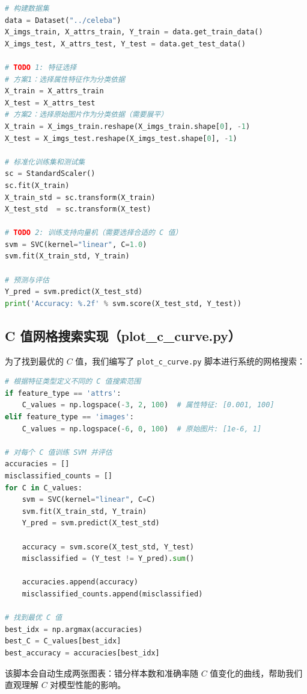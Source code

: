 \documentclass[UTF8]{ctexart}
\begin{document}
\begin{lstlisting}[language=Python, caption=svm.py 核心代码片段]
# 构建数据集
data = Dataset("../celeba")
X_imgs_train, X_attrs_train, Y_train = data.get_train_data()
X_imgs_test, X_attrs_test, Y_test = data.get_test_data()

# TODO 1: 特征选择
# 方案1：选择属性特征作为分类依据
X_train = X_attrs_train
X_test = X_attrs_test
# 方案2：选择原始图片作为分类依据（需要展平）
X_train = X_imgs_train.reshape(X_imgs_train.shape[0], -1)
X_test = X_imgs_test.reshape(X_imgs_test.shape[0], -1)

# 标准化训练集和测试集
sc = StandardScaler()
sc.fit(X_train)
X_train_std = sc.transform(X_train)
X_test_std  = sc.transform(X_test)

# TODO 2: 训练支持向量机（需要选择合适的 C 值）
svm = SVC(kernel="linear", C=1.0)
svm.fit(X_train_std, Y_train)

# 预测与评估
Y_pred = svm.predict(X_test_std)
print('Accuracy: %.2f' % svm.score(X_test_std, Y_test))
\end{lstlisting}

\subsection{C 值网格搜索实现（plot\_c\_curve.py）}
为了找到最优的 $C$ 值，我们编写了 \texttt{plot\_c\_curve.py} 脚本进行系统的网格搜索：

\begin{lstlisting}[language=Python, caption=C 值网格搜索关键代码]
# 根据特征类型定义不同的 C 值搜索范围
if feature_type == 'attrs':
    C_values = np.logspace(-3, 2, 100)  # 属性特征: [0.001, 100]
elif feature_type == 'images':
    C_values = np.logspace(-6, 0, 100)  # 原始图片: [1e-6, 1]

# 对每个 C 值训练 SVM 并评估
accuracies = []
misclassified_counts = []
for C in C_values:
    svm = SVC(kernel="linear", C=C)
    svm.fit(X_train_std, Y_train)
    Y_pred = svm.predict(X_test_std)
    
    accuracy = svm.score(X_test_std, Y_test)
    misclassified = (Y_test != Y_pred).sum()
    
    accuracies.append(accuracy)
    misclassified_counts.append(misclassified)

# 找到最优 C 值
best_idx = np.argmax(accuracies)
best_C = C_values[best_idx]
best_accuracy = accuracies[best_idx]
\end{lstlisting}

该脚本会自动生成两张图表：错分样本数和准确率随 $C$ 值变化的曲线，帮助我们直观理解 $C$ 对模型性能的影响。
\end{document}
